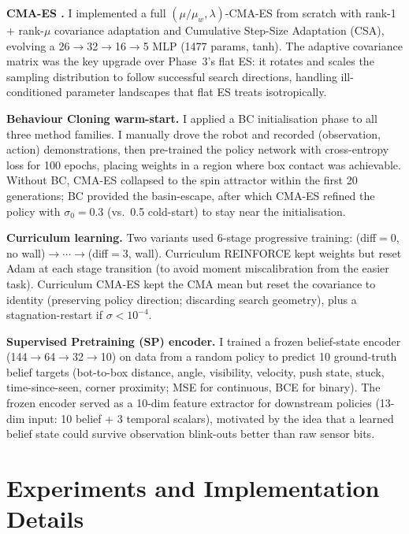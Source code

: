 \documentclass[11pt, oneside]{article}
\begin{document}
\textbf{CMA-ES \cite{hansen2016cma}.} I implemented a full $(\mu/\mu_w, \lambda)$-CMA-ES from scratch with rank-1 + rank-$\mu$ covariance adaptation and Cumulative Step-Size Adaptation (CSA), evolving a 26$\to$32$\to$16$\to$5 MLP (1477 params, tanh). The adaptive covariance matrix was the key upgrade over Phase~3's flat ES: it rotates and scales the sampling distribution to follow successful search directions, handling ill-conditioned parameter landscapes that flat ES treats isotropically.

\textbf{Behaviour Cloning warm-start.} I applied a BC initialisation phase \cite{pomerleau1991} to all three method families. I manually drove the robot and recorded (observation, action) demonstrations, then pre-trained the policy network with cross-entropy loss for 100 epochs, placing weights in a region where box contact was achievable. Without BC, CMA-ES collapsed to the spin attractor within the first 20 generations; BC provided the basin-escape, after which CMA-ES refined the policy with $\sigma_0{=}0.3$ (vs.\ 0.5 cold-start) to stay near the initialisation.

\textbf{Curriculum learning.} Two variants used 6-stage progressive training: (diff$=$0, no wall)$\to\cdots\to$(diff$=$3, wall). Curriculum REINFORCE kept weights but reset Adam at each stage transition (to avoid moment miscalibration from the easier task). Curriculum CMA-ES kept the CMA mean but reset the covariance to identity (preserving policy direction; discarding search geometry), plus a stagnation-restart if $\sigma < 10^{-4}$.

\textbf{Supervised Pretraining (SP) encoder.} I trained a frozen belief-state encoder (144$\to$64$\to$32$\to$10) on data from a random policy to predict 10 ground-truth belief targets (bot-to-box distance, angle, visibility, velocity, push state, stuck, time-since-seen, corner proximity; MSE for continuous, BCE for binary). The frozen encoder served as a 10-dim feature extractor for downstream policies (13-dim input: 10 belief + 3 temporal scalars), motivated by the idea that a learned belief state could survive observation blink-outs better than raw sensor bits.

\section{Experiments and Implementation Details}
\end{document}
